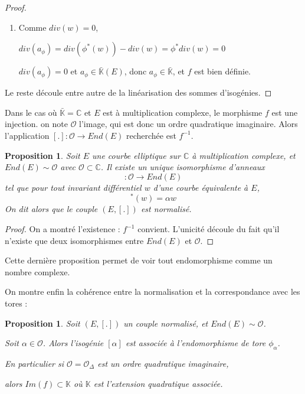 \documentclass{article}
\newcommand{\C}[0]{\mathbb{C}}
\newcommand{\K}[0]{\mathbb{K}}
\newcommand{\Kb}[0]{\bar{\K}}
\newcommand{\OR}[0]{\mathcal{O}}
\newtheorem{Prop}[The]{Proposition}
\begin{document}
\begin{proof}
	\begin{enumerate}
		\item Comme $div(w) = 0$, 
		
		$div(a_{\phi}) = div\left( \phi^{*}(w)\right) - div(w) = \phi^{*}div(w) = 0$
		
		$div(a_{\phi}) = 0$ et $a_{\phi}\in\Kb(E)$, donc $a_{\phi}\in\Kb$, et $f$ est bien définie.
	\end{enumerate}
	Le reste découle entre autre de la linéarisation des sommes d'isogénies.
\end{proof}

Dans le cas où $\Kb = \C$ et $E$ est à multiplication complexe, le morphisme $f$ est une injection. on note $\OR$ l'image, qui est donc un ordre quadratique imaginaire. 
Alors l'application $[.] : \OR \rightarrow End(E)$ recherchée est $f^{-1}$. 

\begin{Prop}
	Soit $E$ une courbe elliptique sur $\C$ à multiplication complexe, et $End(E)\sim\OR$ avec $\OR\subset\C$. Il existe un unique isomorphisme d'anneaux
	\begin{equation*}
		[.] : \OR\rightarrow End(E)
	\end{equation*}
	tel que pour tout invariant différentiel $w$ d'une courbe équivalente à $E$,
	\begin{equation*}
		[\alpha]^{*}(w) = \alpha w
	\end{equation*}
	On dit alors que le couple $(E,[.])$ est normalisé.
\end{Prop}

\begin{proof}
	On a montré l'existence : $f^{-1}$ convient. L'unicité découle du fait qu'il n'existe que deux isomorphismes entre $End(E)$ et $\OR$.
\end{proof}

Cette dernière proposition permet de voir tout endomorphisme comme un nombre complexe. 

On montre enfin la cohérence entre la normalisation et la correspondance avec les tores :

\begin{Prop}
	Soit $(E,[.])$ un couple normalisé, et $End(E)\sim\OR$. 
	
	Soit $\alpha\in\OR$. Alors l'isogénie $[\alpha]$ est associée à l'endomorphisme de tore $\phi_{\alpha}$.
	
	En particulier si $\OR = \OR_{\Delta}$ est un ordre quadratique imaginaire, 
	
	alors $Im(f)\subset\K$ où $\K$ est l'extension quadratique associée.
	
\end{Prop}
\end{document}
